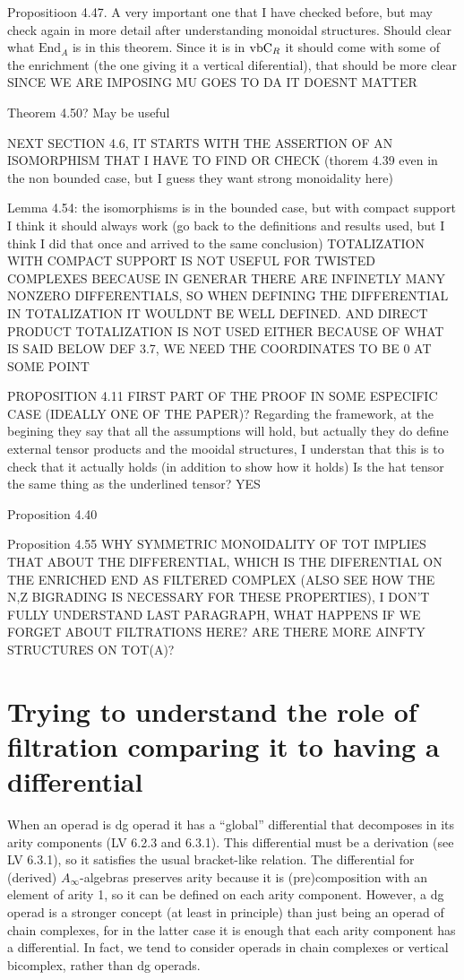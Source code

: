 \documentclass[twoside]{article}
\begin{document}
Propositioon 4.47. A very important one that I have checked before, but may check again in more detail after understanding monoidal structures. Should clear what $\mathrm{End}_A$ is in this theorem. Since it is in $\mathrm{vbC}_R$ it should come with some of the enrichment (the one giving it a vertical diferential), that should be more clear SINCE WE ARE IMPOSING MU GOES TO DA IT DOESNT MATTER

Theorem 4.50? May be useful

NEXT SECTION 4.6, IT STARTS WITH THE ASSERTION OF AN ISOMORPHISM THAT I HAVE TO FIND OR CHECK (thorem 4.39 even in the non bounded case, but I guess they want strong monoidality here)

Lemma 4.54: the isomorphisms is in the bounded case, but with compact support I think it should always work (go back to the definitions and results used, but I think I did that once and arrived to the same conclusion) TOTALIZATION WITH COMPACT SUPPORT IS NOT USEFUL FOR TWISTED COMPLEXES BEECAUSE IN GENERAR  THERE ARE INFINETLY MANY NONZERO DIFFERENTIALS, SO WHEN DEFINING THE DIFFERENTIAL IN TOTALIZATION IT WOULDNT BE WELL DEFINED. AND DIRECT PRODUCT TOTALIZATION IS NOT USED EITHER BECAUSE OF WHAT IS SAID BELOW DEF 3.7, WE NEED THE COORDINATES TO BE 0 AT SOME POINT


PROPOSITION 4.11 FIRST PART OF THE PROOF IN SOME ESPECIFIC CASE (IDEALLY ONE OF THE PAPER)?
Regarding the framework, at the begining they say that all the assumptions will hold, but actually they do define external tensor products and the mooidal structures, I understan that this is to check that it actually holds (in addition to show how it holds) Is the hat tensor the same thing as the underlined tensor? YES

Proposition 4.40

Proposition 4.55 WHY SYMMETRIC MONOIDALITY OF TOT IMPLIES THAT ABOUT THE DIFFERENTIAL, WHICH IS THE DIFERENTIAL ON THE ENRICHED END AS FILTERED COMPLEX (ALSO SEE HOW THE N,Z BIGRADING IS NECESSARY FOR THESE PROPERTIES), I DON'T FULLY UNDERSTAND LAST PARAGRAPH, WHAT HAPPENS IF WE FORGET ABOUT FILTRATIONS HERE? ARE THERE MORE AINFTY STRUCTURES ON TOT(A)?


\section*{Trying to understand the role of filtration comparing it to having a differential}

When an operad is dg operad it has a ``global'' differential that decomposes in its arity components (LV 6.2.3 and 6.3.1). This differential must be a derivation (see LV 6.3.1), so it satisfies the usual bracket-like relation. The differential for (derived) $A_\infty$-algebras  preserves arity because it is (pre)composition with an element of arity 1, so it can be defined on each arity component. However, a dg operad is a stronger concept (at least in principle) than just being an operad of chain complexes, for in the latter case it is enough that each arity component has a differential. In fact, we tend to consider operads in chain complexes or vertical bicomplex, rather than dg operads.
\end{document}
